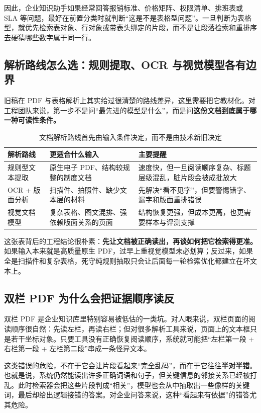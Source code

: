 因此，企业知识助手如果经常回答报销标准、价格矩阵、权限清单、排班表或 SLA 等问题，最好在前置分类时就判断“这是不是表格型问题”。一旦判断为表格型，就优先检索表对象、行对象或带表头绑定的片段，而不是让段落检索和重排序去硬猜哪些数字属于同一行。

\subsection{解析路线怎么选：规则提取、OCR 与视觉模型各有边界}
旧稿在 PDF 与表格解析上其实给过很清楚的路线差异，这里需要把它教材化。对工程团队来说，第一步不是问“最先进的模型是什么”，而是问\textbf{这份文档到底属于哪一种可读性条件。}

\begin{table}[H]
\centering
\small
\begin{tabularx}{\textwidth}{>{\raggedright\arraybackslash}p{2.8cm}>{\raggedright\arraybackslash}p{3.1cm}>{\raggedright\arraybackslash}X}
\toprule
\textbf{解析路线} & \textbf{更适合什么输入} & \textbf{主要提醒} \\
\midrule
规则型文本提取 & 原生电子 PDF、结构较规整的制度文档 & 速度快，但一旦阅读顺序复杂、标题层级混乱，脏片段会被成批放大 \\
OCR + 版面分析 & 扫描件、拍照件、缺少文本层的材料 & 先解决“看不见字”，但要警惕错字、漏字和版面重排错误 \\
视觉文档模型 & 复杂表格、图文混排、强依赖版面关系的页面 & 结构恢复更强，但成本更高，也更需要样本与评测支撑 \\
\bottomrule
\end{tabularx}
\caption{文档解析路线首先由输入条件决定，而不是由技术新旧决定}
\label{tab:document-parsing-routes}
\end{table}

这张表背后的工程结论很朴素：\textbf{先让文档被正确读出，再谈如何把它检索得更准。} 如果输入本来就是高质量原生 PDF，过早上重视觉模型未必划算；反过来，如果全是扫描件和复杂表格，死守纯规则抽取只会让后面每一轮检索优化都建立在坏文本上。

\subsection{双栏 PDF 为什么会把证据顺序读反}
双栏 PDF 是企业知识库里特别容易被低估的一类坑。对人眼来说，双栏页面的阅读顺序很自然：先读左栏，再读右栏；但对很多解析工具来说，页面上的文本框只是若干坐标对象。只要工具没有正确恢复阅读顺序，系统就可能把“左栏第一段 + 右栏第一段 + 左栏第二段”串成一条怪异文本。

这类错误的危险，不在于它会让片段看起来“完全乱码”，而在于它往往\textbf{半对半错}。也就是说，系统仍然能读出许多正确词语和句子，但关键信息的邻接关系已经被打乱。此时检索器会把这些片段判成“相关”，模型也会从中抽取出一些像样的关键词，最后却给出逻辑接错的答案。对企业问答来说，这种“看起来有依据”的错答尤其危险。


